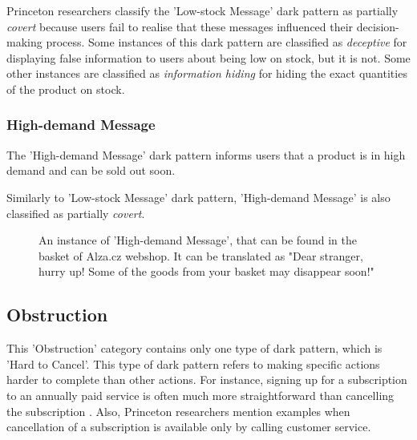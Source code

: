                 Princeton researchers classify the 'Low-stock Message' dark pattern as partially \emph{covert} because users fail to realise that these messages influenced their decision-making process. Some instances of this dark pattern are classified as \emph{deceptive} for displaying false information to users about being low on stock, but it is not. Some other instances are classified as \emph{information hiding} for hiding the exact quantities of the product on stock.
        
                \subsubsection{High-demand Message}
                The 'High-demand Message' dark pattern informs users that a product is in high demand and can be sold out soon.
        
                Similarly to 'Low-stock Message' dark pattern, 'High-demand Message' is also classified as partially \emph{covert}.
        
                \begin{figure}[ht]
                    \centering
                    \caption{An instance of 'High-demand Message', that can be found in the basket of Alza.cz webshop. It can be translated as "Dear stranger, hurry up! Some of the goods from your basket may disappear soon!"}
                    \label{fig:high-demand-message-alza}
                \end{figure}
        
            \subsection{Obstruction}
            This 'Obstruction' category contains only one type of dark pattern, which is 'Hard to Cancel'. This type of dark pattern refers to making specific actions harder to complete than other actions. For instance, signing up for a subscription to an annually paid service is often much more straightforward than cancelling the subscription \cite{unbounce-subscription}. Also, Princeton researchers mention examples when cancellation of a subscription is available only by calling customer service\cite{dark-patterns-at-scale}.
        
